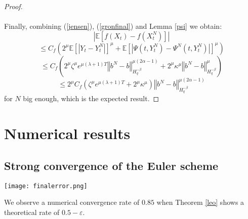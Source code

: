 \documentclass[11pt]{article}
\newcommand{\norme}[1]{\left\Vert #1\right\Vert}
\newcommand{\E}{\mathbb{E}}
\begin{document}
\begin{proof}
    \paragraph{}
    Finally, combining (\ref{jensen}), (\ref{gronfinal}) and Lemma \ref{psi} we obtain:    
    \begin{equation*}
    \left|\E\left[f\left(X_t\right)-f\left(X_t^N\right)\right]\right| 
    \end{equation*}
    \begin{equation*}
    \leq C_f  \left(2^\mu\E\left[\left|Y_t-Y_t^N\right|\right]^\mu+\E\left[\left|\Psi\left(t,Y_t^N\right)-\Psi^N\left(t,Y_t^N\right)\right|\right]^\mu\right)
    \end{equation*} 
    \begin{equation*}
    \leq C_f  \left(2^\mu\zeta^\mu e^{\mu(\lambda+1)T} \norme{b^N-b}_{H^{-\beta}_{q}}^{\mu(2\alpha-1)} + 2^\mu \kappa^\mu \norme{b^N-b}_{H^{-\beta}_q}^\mu\right)
    \end{equation*}
    \begin{equation*}
    \leq 2^\mu C_f  \left(\zeta^\mu e^{\mu(\lambda+1)T} + 2^\mu \kappa^\mu\right)\norme{b^N-b}_{H^{-\beta}_{q}}^{\mu(2\alpha-1)}
    \end{equation*}       
    for $N$ big enough, which is the expected result.
    
\end{proof}   

\section{Numerical results}
    \subsection{Strong convergence of the Euler scheme}
    
        \begin{center}
            \texttt{[image: finalerror.png]}
        \end{center}
    
    We observe a numerical convergence rate of $0.85$ when Theorem \ref{leo} shows a theoretical rate of $0.5-\varepsilon$.
 


    
\end{document}
